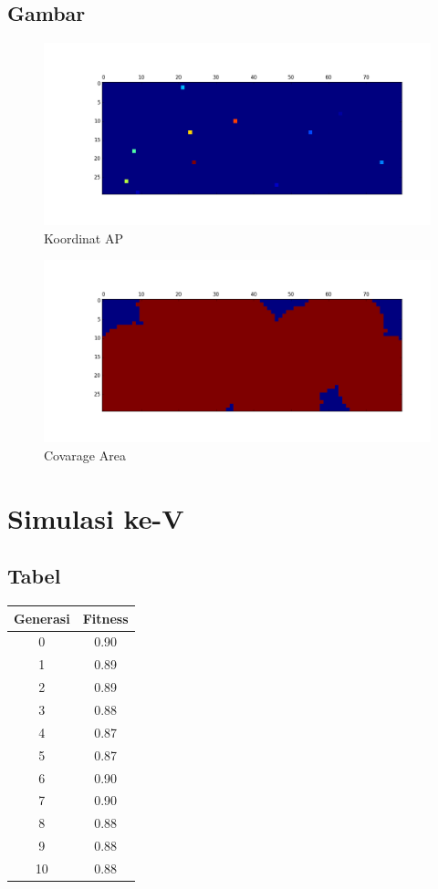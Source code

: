 \documentclass[11pt,a4paper,titlepage]{report}
\begin{document}
	\subsection*{Gambar}
	\begin{figure}[h]
		\centering
		\includegraphics[width=0.9\linewidth]{apLoc_04}
		\caption{Koordinat AP}
		\label{fig:apLoc_04}
	\end{figure}
	\begin{figure}[h]
		\centering
		\includegraphics[width=0.9\linewidth]{coverage_04}
		\caption{Covarage Area}
		\label{fig:coverage_04}
	\end{figure}
	\newpage
	\section*{Simulasi ke-V}
	\subsection*{Tabel}
	\begin{tabular}{|c|c|}
		\hline Generasi & Fitness \\ 
		\hline 0 & 0.90 \\ 
		\hline 1 & 0.89 \\ 
		\hline 2 & 0.89 \\ 
		\hline 3 & 0.88 \\ 
		\hline 4 & 0.87 \\ 
		\hline 5 & 0.87 \\ 
		\hline 6 & 0.90 \\ 
		\hline 7 & 0.90 \\ 
		\hline 8 & 0.88 \\ 
		\hline 9 & 0.88 \\ 
		\hline 10 & 0.88 \\
		\hline
	\end{tabular} 
\end{document}
